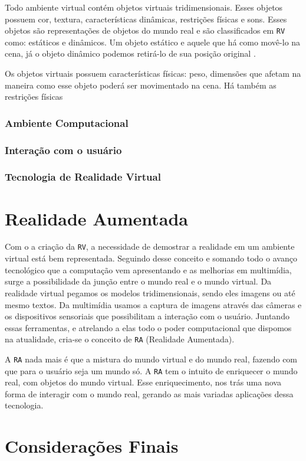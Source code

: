 Todo ambiente virtual contém objetos virtuais tridimensionais. Esses objetos possuem cor, textura, características dinâmicas, restrições físicas e sons. Esses objetos são representações de objetos do mundo real e são classificados em \verb'RV' como: estáticos e dinâmicos. Um objeto estático e aquele que há como movê-lo na cena, já o objeto dinâmico podemos retirá-lo de sua posição original \cite{kirner2006}.

Os objetos virtuais possuem características físicas: peso, dimensões que afetam na maneira como esse objeto poderá ser movimentado na cena. Há também as restrições físicas

\subsubsection{Ambiente Computacional}

\subsubsection{Interação com o usuário}

\subsubsection{Tecnologia de Realidade Virtual}

\section {Realidade Aumentada}

Com o a criação da \verb'RV', a necessidade de demostrar a realidade em um ambiente virtual está bem representada. Seguindo desse conceito e somando todo o avanço tecnológico que a computação vem apresentando e as melhorias em multimídia, surge a possibilidade da junção entre o mundo real e o mundo virtual. Da realidade virtual pegamos os modelos tridimensionais, sendo eles imagens ou até mesmo textos. Da multimídia usamos a captura de imagens através das câmeras e os dispositivos sensoriais que possibilitam a interação com o usuário. Juntando essas ferramentas, e atrelando a elas todo o poder computacional que dispomos na atualidade, cria-se o conceito de \verb'RA' (Realidade Aumentada).

A \verb'RA' nada mais é que a mistura do mundo virtual e do mundo real, fazendo com que para o usuário seja um mundo só. A \verb'RA' tem o intuito de enriquecer o mundo real, com objetos do mundo virtual. Esse enriquecimento, nos trás uma nova forma de interagir com o mundo real, gerando as mais variadas aplicações dessa tecnologia.




\section {Considerações Finais}
